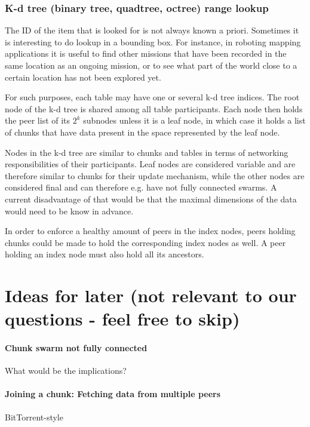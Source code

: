\documentclass[a4paper, 10pt, conference]{ieeeconf}
\begin{document}
\subsubsection{K-d tree (binary tree, quadtree, octree) range lookup}

The ID of the item that is looked for is not always known a priori. Sometimes
it is interesting to do lookup in a bounding box. For instance, in roboting
mapping applications it is useful to find other missions that have been recorded
in the same location as an ongoing mission, or to see what part of the
world close to a certain location has not been explored yet.

For such purposes, each table may have one or several k-d tree indices.
The root node of the k-d tree is shared among all table participants. Each
node then holds the peer list of its $2^k$ subnodes unless it is a leaf node,
in which case it holds a list of chunks that have data present in the space
represented by the leaf node.

Nodes in the k-d tree are similar to chunks and tables in terms of networking
responsibilities of their participants. Leaf nodes are considered variable and
are therefore similar to chunks for their update mechanism, while the other
nodes are considered final and can therefore e.g. have not fully connected
swarms. A current disadvantage of that would be that the maximal dimensions of
the data would need to be know in advance.

In order to enforce a healthy amount of peers in the index nodes, peers holding
chunks could be made to hold the corresponding index nodes as well. A peer
holding an index node must also hold all its ancestors.

\section{Ideas for later (not relevant to our questions - feel free to skip)}

\paragraph{Chunk swarm not fully connected}
What would be the implications?

\paragraph{Joining a chunk: Fetching data from multiple peers} 
BitTorrent-style
\end{document}
